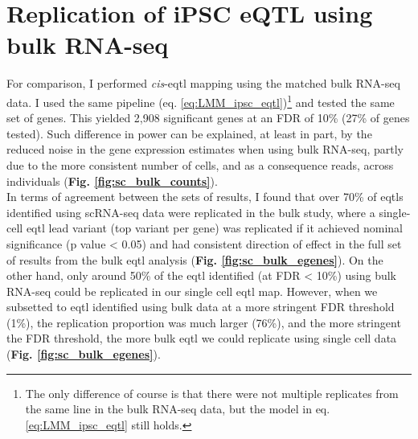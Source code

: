 \newpage

\section{Replication of iPSC eQTL using bulk RNA-seq}

For comparison, I performed \textit{cis}-\gls{eqtl} mapping using the matched bulk RNA-seq data.
I used the same pipeline (eq. \eqref{eq:LMM_ipsc_eqtl})\footnote{The only difference of course is that there were not multiple replicates from the same line in the bulk RNA-seq data, but the model in eq. \eqref{eq:LMM_ipsc_eqtl} still holds.} and tested the same set of genes. 
This yielded 2,908 significant genes at an FDR of 10\%
(27\% of genes tested).
Such difference in power can be explained, at least in part, by the reduced noise in the gene expression estimates when using bulk RNA-seq, partly due to the more consistent number of cells, and as a consequence reads, across individuals (\textbf{Fig. \ref{fig:sc_bulk_counts}}).
\\

In terms of agreement between the sets of results, I found that over 70\% of \glspl{eqtl} identified using scRNA-seq data were replicated in the bulk study, where a single-cell \gls{eqtl} lead variant (top variant per gene) was replicated if it achieved nominal significance (p value < 0.05) and had consistent direction of effect in the full set of results from the bulk \gls{eqtl} analysis (\textbf{Fig. \ref{fig:sc_bulk_egenes}}). 
On the other hand, only around 50\% of the \gls{eqtl} identified (at FDR < 10\%) using bulk RNA-seq could be replicated
in our single cell \gls{eqtl} map.
However, when we subsetted to \gls{eqtl} identified using bulk data at a more stringent FDR threshold (1\%), the replication proportion was much larger (76\%), and the more stringent the FDR threshold, the more bulk \gls{eqtl} we could replicate using single cell data (\textbf{Fig. \ref{fig:sc_bulk_egenes}}).

